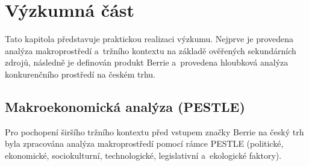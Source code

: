 \chapter{Výzkumná část}
\label{chap:research}

Tato kapitola představuje praktickou realizaci výzkumu. Nejprve je provedena analýza makroprostředí a~tržního kontextu na základě ověřených sekundárních zdrojů, následně je definován produkt Berrie a~provedena hloubková analýza konkurenčního prostředí na českém trhu.

\section{Makroekonomická analýza (PESTLE)}
\label{sec:res_pestle}

Pro pochopení širšího tržního kontextu před vstupem značky Berrie na český trh byla zpracována analýza makroprostředí pomocí rámce PESTLE (politické, ekonomické, sociokulturní, technologické, legislativní a~ekologické faktory).

